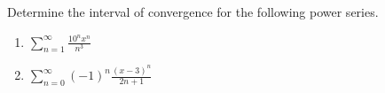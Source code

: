 Determine the interval of convergence for the following power series. 
\begin{enumerate}
\item $\displaystyle \sum \limits_{n= 1}^{\infty} \frac{ 10^nx^n}{n^3}$
\item $\displaystyle \sum\limits_{n=0}^{\infty}(-1)^n \frac{(x- 3)^n }{ 2n+1} $
\answer{$x\in (2, 4]$}
\end{enumerate}